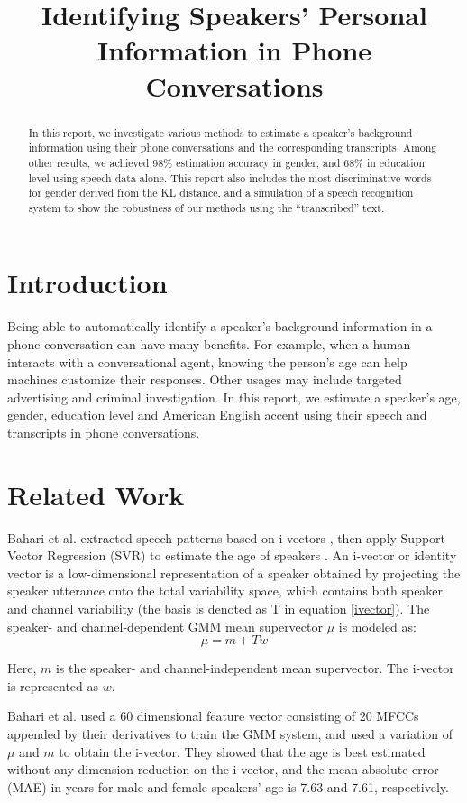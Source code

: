 \documentclass[a4paper]{article}
\title{Identifying Speakers' Personal Information in Phone Conversations}
\begin{document}
\maketitle


\begin{abstract}
In this report, we investigate various methods to estimate a speaker's background information using their phone conversations and the corresponding transcripts. Among other results, we achieved 98\% estimation accuracy in gender, and 68\% in education level using speech data alone. This report also includes the most discriminative words for gender derived from the KL distance, and a simulation of a speech recognition system to show the robustness of our methods using the ``transcribed'' text.
\end{abstract}


\section{Introduction}
Being able to automatically identify a speaker's background information in a phone conversation can have many benefits. For example, when a human interacts with a conversational agent, knowing the person's age can help machines customize their responses. Other usages may include targeted advertising and criminal investigation. In this report, we estimate a speaker's age, gender, education level and American English accent using their speech and transcripts in phone conversations.

\section{Related Work}
Bahari et al. extracted speech patterns based on i-vectors \cite{dehak}, then apply Support Vector Regression (SVR) to estimate the age of speakers \cite{bahari}. An i-vector or identity vector is a low-dimensional representation of a speaker obtained by projecting the speaker utterance onto the total variability space, which contains both speaker and channel variability (the basis is denoted as T in equation \ref{ivector}).  The speaker- and channel-dependent GMM mean supervector $\mu$ is modeled as:  
\begin{equation}
\mu = m + Tw
\label{ivector}
\end{equation}

Here, $m$ is the speaker- and channel-independent mean supervector. The i-vector is represented as $w$.

Bahari et al. used a 60 dimensional feature vector consisting of 20 MFCCs appended by their derivatives to train the GMM system, and used a variation of $\mu$ and $m$ to obtain the i-vector. They showed that the age is best estimated without any dimension reduction on the i-vector, and the mean absolute error (MAE) in years for male and female speakers' age is 7.63 and 7.61, respectively.
\end{document}

